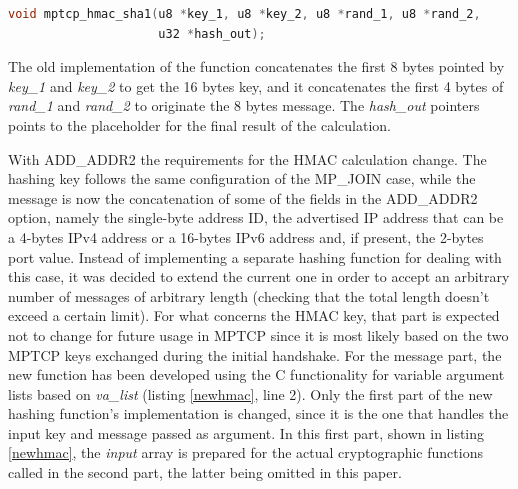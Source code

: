 \begin{lstlisting}[language=c, caption=Prototype for the old \textit{mptcp\_hmac\_sha1() function}, label=oldhmac]
void mptcp_hmac_sha1(u8 *key_1, u8 *key_2, u8 *rand_1, u8 *rand_2, 
                     u32 *hash_out);
\end{lstlisting}
 
The old implementation of the function concatenates the first 8 bytes pointed by \textit{key\_1} and \textit{key\_2} to get the 16 bytes key, and it concatenates the first 4 bytes of \textit{rand\_1} and \textit{rand\_2} to originate the 8 bytes message. The \textit{hash\_out} pointers points to the placeholder for the final result of the calculation.


With ADD\_ADDR2 the requirements for the HMAC calculation change. The hashing key follows the same configuration of the MP\_JOIN case, while the message is now the concatenation of some of the fields in the ADD\_ADDR2 option, namely the single-byte address ID, the advertised IP address that can be a 4-bytes IPv4 address or a 16-bytes IPv6 address and, if present, the 2-bytes port value. Instead of implementing a separate hashing function for dealing with this case,  it was decided to extend the current one in order to accept an arbitrary number of messages of arbitrary length (checking that the total length doesn't exceed a certain limit). For what concerns the HMAC key, that part is expected not to change for future usage in MPTCP since it is most likely based on the two MPTCP keys exchanged during the initial handshake. For the message part, the new function has been developed using the C functionality for variable argument lists based on \textit{va\_list} (listing \ref{newhmac}, line 2). Only the first part of the new hashing function's implementation is changed, since it is the one that handles the input key and message passed as argument. In this first part, shown in listing \ref{newhmac}, the \textit{input} array is prepared for the actual cryptographic functions called in the second part, the latter being omitted in this paper.

